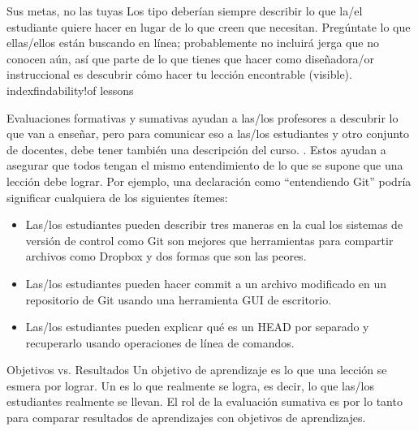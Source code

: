 \begin{aside}{Sus metas, no las tuyas}
Los tipo deberían siempre describir lo que la/el estudiante quiere hacer
en lugar de lo que creen que necesitan.
Pregúntate lo que ellas/ellos están buscando en línea;
probablemente no incluirá jerga que no conocen aún,
así que parte de lo que tienes que hacer como diseñadora/or instruccional es
descubrir cómo hacer tu lección encontrable (visible). index{findability!of lessons}
\end{aside}


 
Evaluaciones formativas y sumativas ayudan a las/los profesores a descubrir lo que van a enseñar,
pero para comunicar eso a las/los estudiantes y otro conjunto de docentes,
debe tener también una descripción del curso.
.
Estos ayudan a asegurar que
todos tengan el mismo entendimiento de lo que se supone que una lección debe lograr.
Por ejemplo,
una declaración como ``entendiendo Git'' podría significar cualquiera de los siguientes ítemes:
 
\begin{itemize}
 
\item
  Las/los estudiantes pueden describir tres maneras
  en la cual los sistemas de versión de control como Git  son mejores que herramientas para compartir archivos como Dropbox
  y dos formas que son las peores.
 
\item
Las/los estudiantes pueden hacer commit a un archivo modificado en un repositorio de Git
usando una herramienta GUI de escritorio.
 
\item
  Las/los estudiantes pueden explicar qué es un HEAD por separado
 y recuperarlo usando operaciones de línea de comandos.
 
\end{itemize}
 

\begin{aside}{Objetivos vs. Resultados}
 Un objetivo de aprendizaje es lo que una lección se esmera por lograr.
 Un  es lo que realmente se logra,
 es decir, lo que las/los estudiantes realmente se llevan.
El rol de la evaluación sumativa es por lo tanto
para comparar resultados de aprendizajes con objetivos de aprendizajes.
\end{aside}
 

